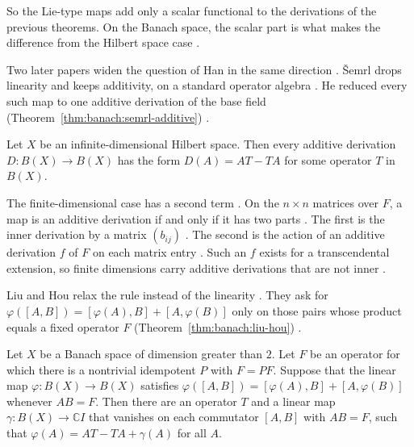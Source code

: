 So the Lie-type maps add only a scalar functional to the derivations of the
previous theorems. On the Banach space, the scalar part is what makes the
difference from the Hilbert space case
\cite[p.~6]{ZhangWei2017}.

Two later papers widen the question of Han in the same direction
\cite[pp.~234, 81]{Semrl1991Additive,LiuHou2025Lie}. \v{S}emrl drops
linearity and keeps additivity, on a standard operator algebra
\cite[p.~234]{Semrl1991Additive}. He reduced every such map to one additive
derivation of the base field (Theorem~\ref{thm:banach:semrl-additive}) \cite[p.~235]{Semrl1991Additive}.

\begin{theorem}\label{thm:banach:semrl-additive}
Let $X$ be an infinite-dimensional Hilbert space. Then every additive
derivation $D\colon B(X)\to B(X)$ has the form $D(A)=AT-TA$ for some operator
$T$ in $B(X)$.
\end{theorem}

The finite-dimensional case has a second term
\cite[Theorem~2.2, p.~236]{Semrl1991Additive}. On the $n\times n$ matrices
over $F$, a map is an additive derivation if and only if it has two parts
\cite[Theorem~2.2, p.~236]{Semrl1991Additive}. The first is the inner
derivation by a matrix $(b_{ij})$ \cite[Theorem~2.2, p.~236]{Semrl1991Additive}. The second is the action of an additive
derivation $f$ of $F$ on each matrix entry
\cite[Theorem~2.2, p.~236]{Semrl1991Additive}. Such an $f$ exists for a
transcendental extension, so finite dimensions carry additive derivations that
are not inner \cite[p.~235]{Semrl1991Additive}.

Liu and Hou relax the rule instead of the linearity
\cite[p.~81]{LiuHou2025Lie}. They ask for
$\varphi([A,B])=[\varphi(A),B]+[A,\varphi(B)]$ only on those pairs whose
product equals a fixed operator $F$ (Theorem~\ref{thm:banach:liu-hou}) \cite[p.~81]{LiuHou2025Lie}.

\begin{theorem}\label{thm:banach:liu-hou}
Let $X$ be a Banach space of dimension greater than $2$. Let $F$ be an
operator for which there is a nontrivial idempotent $P$ with $F=PF$. Suppose
that the linear map $\varphi\colon B(X)\to B(X)$ satisfies
$\varphi([A,B])=[\varphi(A),B]+[A,\varphi(B)]$ whenever $AB=F$. Then there are
an operator $T$ and a linear map $\gamma\colon B(X)\to\mathbb{C}I$ that
vanishes on each commutator $[A,B]$ with $AB=F$, such that
$\varphi(A)=AT-TA+\gamma(A)$ for all $A$.
\end{theorem}

